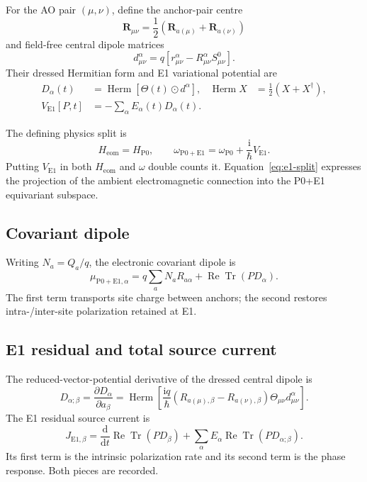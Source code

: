 \documentclass[11pt]{article}
\newcommand{\ii}{\mathrm{i}}
\newcommand{\dd}{\mathrm{d}}
\newcommand{\hH}{H_{\mathrm{eom}}}
\newcommand{\Pzero}{\mathrm{P0}}
\newcommand{\Eone}{\mathrm{E1}}
\newcommand{\ReTr}{\operatorname{Re}\operatorname{Tr}}
\newcommand{\Herm}{\operatorname{Herm}}
\newcommand{\vect}[1]{\bm{#1}}
\begin{document}
For the AO pair \((\mu,\nu)\), define the anchor-pair centre
\begin{equation}
 \vect R_{\mu\nu}
 =\frac12\left(\vect R_{a(\mu)}+\vect R_{a(\nu)}\right)
\end{equation}
and field-free central dipole matrices
\begin{equation}
 d^\alpha_{\mu\nu}
 =q\left[r^\alpha_{\mu\nu}
          -R^\alpha_{\mu\nu}S^0_{\mu\nu}\right].
 \label{eq:central-dipole}
\end{equation}
Their dressed Hermitian form and E1 variational potential are
\begin{align}
 D_\alpha(t)
   &=\Herm\!\left[\Theta(t)\odot d^\alpha\right],
 &\Herm X&=\frac12(X+X^\dagger),\label{eq:dressed-dipole}\\
 V_{\Eone}[P,t]
   &=-\sum_\alpha E_\alpha(t)D_\alpha(t).
 \label{eq:e1-potential}
\end{align}

The defining physics split is
\begin{equation}
 \boxed{
 \hH=H_{\Pzero},\qquad
 \omega_{\Pzero+\Eone}
 =\omega_{\Pzero}+\frac{\ii}{\hbar}V_{\Eone}.}
 \label{eq:e1-split}
\end{equation}
Putting \(V_{\Eone}\) in both \(\hH\) and \(\omega\) double counts it.
Equation~\eqref{eq:e1-split} expresses the projection of the ambient
electromagnetic connection into the P0+E1 equivariant subspace.

\subsection{Covariant dipole}

Writing \(N_a=Q_a/q\), the electronic covariant dipole is
\begin{equation}
 \mu_{\Pzero+\Eone,\alpha}
 =q\sum_a N_aR_{a\alpha}+\ReTr(PD_\alpha).
 \label{eq:covariant-dipole}
\end{equation}
The first term transports site charge between anchors; the second restores
intra-/inter-site polarization retained at E1.

\subsection{E1 residual and total source current}

The reduced-vector-potential derivative of the dressed central dipole is
\begin{equation}
 D_{\alpha;\beta}
 =\frac{\partial D_\alpha}{\partial a_\beta}
 =\Herm\!\left[
 \frac{\ii q}{\hbar}
 (R_{a(\mu),\beta}-R_{a(\nu),\beta})
 \Theta_{\mu\nu}d^\alpha_{\mu\nu}
 \right].
 \label{eq:dressed-dipole-derivative}
\end{equation}
The E1 residual source current is
\begin{equation}
 J_{\Eone,\beta}
 =\frac{\dd}{\dd t}\ReTr(PD_\beta)
 +\sum_\alpha E_\alpha\ReTr(PD_{\alpha;\beta}).
 \label{eq:e1-current}
\end{equation}
Its first term is the intrinsic polarization rate and its second term is the
phase response. Both pieces are recorded.
\end{document}
